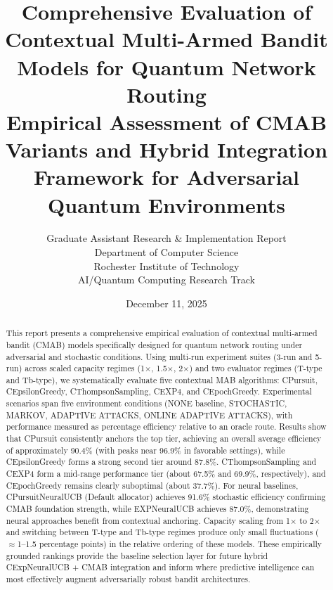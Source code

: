 \documentclass[12pt,a4paper]{article}
\title{\textbf{Comprehensive Evaluation of Contextual Multi-Armed Bandit Models for Quantum Network Routing}\\
\large{Empirical Assessment of CMAB Variants and Hybrid Integration Framework for Adversarial Quantum Environments}}
\author{Graduate Assistant Research \& Implementation Report\\ 
Department of Computer Science \\ 
Rochester Institute of Technology \\ 
AI/Quantum Computing Research Track}
\date{December 11, 2025}
\begin{document}
\maketitle

\begin{abstract}
This report presents a comprehensive empirical evaluation of contextual multi-armed bandit (CMAB) models specifically designed for quantum network routing under adversarial and stochastic conditions. Using multi-run experiment suites (3-run and 5-run) across scaled capacity regimes (1$\times$, 1.5$\times$, 2$\times$) and two evaluator regimes (T-type and Tb-type), we systematically evaluate five contextual MAB algorithms: CPursuit, CEpsilonGreedy, CThompsonSampling, CEXP4, and CEpochGreedy. Experimental scenarios span five environment conditions (NONE baseline, STOCHASTIC, MARKOV, ADAPTIVE ATTACKS, ONLINE ADAPTIVE ATTACKS), with performance measured as percentage efficiency relative to an oracle route. Results show that CPursuit consistently anchors the top tier, achieving an overall average efficiency of approximately 90.4\% (with peaks near 96.9\% in favorable settings), while CEpsilonGreedy forms a strong second tier around 87.8\%. CThompsonSampling and CEXP4 form a mid-range performance tier (about 67.5\% and 69.9\%, respectively), and CEpochGreedy remains clearly suboptimal (about 37.7\%). For neural baselines, CPursuitNeuralUCB (Default allocator) achieves 91.6\% stochastic efficiency confirming CMAB foundation strength, while EXPNeuralUCB achieves 87.0\%, demonstrating neural approaches benefit from contextual anchoring. Capacity scaling from 1$\times$ to 2$\times$ and switching between T-type and Tb-type regimes produce only small fluctuations ($\approx$1--1.5 percentage points) in the relative ordering of these models. These empirically grounded rankings provide the baseline selection layer for future hybrid CExpNeuralUCB + CMAB integration and inform where predictive intelligence can most effectively augment adversarially robust bandit architectures.
\end{abstract}

\newpage
{\tableofcontents}

\newpage
\end{document}
